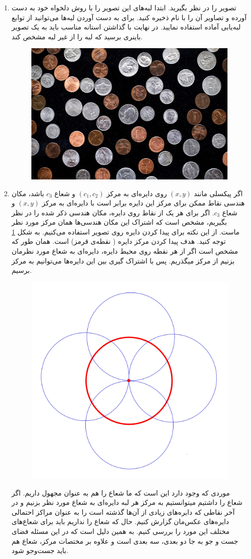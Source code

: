 \documentclass[a4paper]{article}
\begin{document}
\begin{enumerate}
	\item 
	تصویر
را در نظر بگیرید. ابتدا لبه‌های این تصویر را با روش دلخواه خود به دست آورده و تصاویر آن را با نام
ذخیره کنید. برای به دست آوردن لبه‌ها می‌توانید از توابع لبه‌یابی آماده استفاده نمایید. در نهایت با گذاشتن استانه مناسب باید به یک تصویر باینری برسید که لبه را از غیر لبه مشخص کند.
\begin{figure}[H]
	\centering
	\includegraphics[width=.5\linewidth]{im03}
	\caption{}
\end{figure}
	\item
	اگر پیکسلی مانند 
	$ (x,y) $
	 روی دایره‌ای به مرکز 
	$ (c_{1},c_{2}) $
	و شعاع 
	$ c_{3} $
	باشد، مکان هندسی نقاط ممکن برای مرکز این دایره برابر است با دایره‌ای به مرکز 
	$ (x,y) $
	و شعاع 
	$ c_{3} $.
اگر برای هر یک از نقاط روی دایره، مکان هندسی ذکر شده را در نظر بگیریم، مشخص است که اشتراک این مکان هندسی‌ها همان مرکز مورد نظر ماست. از این نکته برای پیدا کردن دایره روی تصویر استفاده می‌کنیم. 
به شکل 
\ref{1}
توجه کنید. هدف پیدا کردن مرکز دایره ( نقطه‌ی قرمز) است. همان طور که مشخص است اگر از هر نقطه روی محیط دایره، دایره‌ای به شعاع مورد نظرمان بزنیم از مرکز میگذریم. پس با اشتراک گیری بین این دایره‌ها می‌توانیم به مرکز برسیم.
\begin{figure}[H]
	\centering
	\includegraphics[width=.4\linewidth]{q2}
	\caption{}
	\label{1}
\end{figure}
موردی که وجود دارد این است که ما شعاع را هم به عنوان مجهول داریم. اگر شعاع را داشتیم میتوانستیم به مرکز هر لبه دایره‌ای به شعاع مورد نظر بزنیم و در آخر نقاطی که دایره‌های زیادی از آن‌‌ها گذشته است را به عنوان مراکز احتمالی دایره‌های عکس‌مان گزارش کنیم. حال که شعاع را نداریم باید برای شعاع‌های مختلف این مورد را بررسی کنیم. به همین دلیل است که در این مسئله فضای جست و جو به جا دو بعدی، سه بعدی است و علاوه بر مختصات مرکز، شعاع هم باید جست‌وجو شود.

\end{enumerate}
\end{document}
